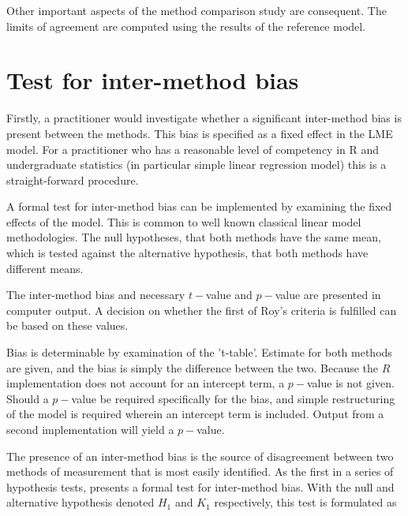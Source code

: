 \documentclass[12pt, a4paper]{report}
\theoremstyle{plain}
\theoremstyle{definition}
\theoremstyle{remark}
\begin{document}
Other important aspects of the method comparison study are consequent. The limits of agreement are computed using the results of the reference model.




\section{Test for inter-method bias}

Firstly, a practitioner would investigate whether a significant inter-method bias is present between the methods. This bias is specified as a fixed effect in the LME model.  For a practitioner who has a reasonable level of competency in R and undergraduate statistics (in particular simple linear regression model) this is a straight-forward procedure.

A formal test for inter-method bias can be implemented by examining the fixed effects of the model. This is common to well known classical linear model methodologies. The null hypotheses, that both methods have the same mean, which is tested against the alternative hypothesis, that both methods have different means.

The inter-method bias and necessary $t-$value and $p-$value are presented in computer output. A decision on whether the first of Roy's criteria is fulfilled can be based on these values.

Bias is determinable by examination of the 't-table'. Estimate for both methods are given, and the bias is simply the difference between the two. Because the $R$ implementation does not account for an intercept term, a $p-$value is not given. Should a $p-$value be required specifically for the bias, and simple restructuring of the model is required wherein an intercept term is included. Output from a second implementation will yield a $p-$value.

The presence of an inter-method bias is the source of disagreement between two methods of measurement that is most easily identified. As the first in a series of hypothesis tests, \citet{roy} presents a formal test for inter-method bias. With the null and alternative hypothesis denoted $H_1$ and $K_1$ respectively, this test is formulated as
%
\end{document}

